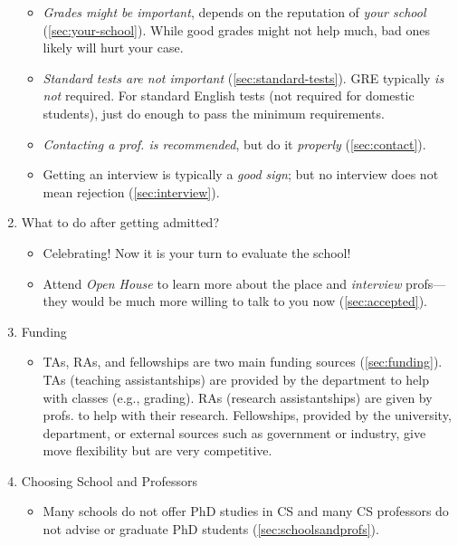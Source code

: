 \documentclass[oneside,11pt,dvipsnames]{book}
\begin{document}
\begin{enumerate}
\begin{itemize}
          \item \emph{Grades might be important}, depends on the reputation of \emph{your school} (\autoref{sec:your-school}). While good grades might not help much, bad ones likely will hurt your case.
          
          \item \emph{Standard tests are not important} (\autoref{sec:standard-tests}). GRE typically \emph{is not} required. For standard English tests (not required for domestic students), just do enough to pass the minimum requirements.

          \item \emph{Contacting a prof. is recommended}, but do it \emph{properly} (\autoref{sec:contact}).

          \item Getting an interview is typically a \emph{good sign}; but no interview does not mean rejection (\autoref{sec:interview}).

        \end{itemize}
  \item What to do after getting admitted?
        \begin{itemize}
                \item  Celebrating! Now it is your turn to evaluate the school!
          \item Attend \emph{Open House} to learn more about the place and \emph{interview} profs---they would be much more willing to talk to you now (\autoref{sec:accepted}).
        \end{itemize}
  \item Funding
        \begin{itemize}
          \item TAs, RAs, and fellowships are two main funding sources (\autoref{sec:funding}).  TAs (teaching assistantships) are provided by the department to help with classes (e.g., grading). RAs (research assistantships) are given by profs. to help with their research.  Fellowships, provided by the university, department, or external sources such as government or industry, give move flexibility but are very competitive.
        \end{itemize}
  \item Choosing School and Professors
        \begin{itemize}
          \item Many schools do not offer PhD studies in CS and many CS professors do not advise or graduate PhD students  (\autoref{sec:schoolsandprofs}).
        \end{itemize}


\end{enumerate}
\end{document}
